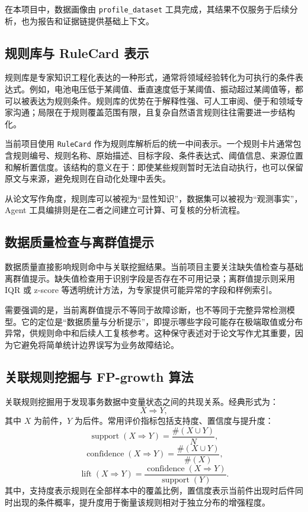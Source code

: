 \documentclass[UTF8,a4paper,zihao=-4]{ctexart}
\begin{document}
在本项目中，数据画像由 \texttt{profile\_dataset} 工具完成，其结果不仅服务于后续分析，也为报告和证据链提供基础上下文。

\subsection{规则库与 RuleCard 表示}

规则库是专家知识工程化表达的一种形式，通常将领域经验转化为可执行的条件表达式。例如，电池电压低于某阈值、垂直速度低于某阈值、振动超过某阈值等，都可以被表达为规则条件。规则库的优势在于解释性强、可人工审阅、便于和领域专家沟通；局限在于规则覆盖范围有限，且复杂自然语言规则往往需要进一步结构化。

当前项目使用 \texttt{RuleCard} 作为规则库解析后的统一中间表示。一个规则卡片通常包含规则编号、规则名称、原始描述、目标字段、条件表达式、阈值信息、来源位置和解析置信度。该结构的意义在于：即使某些规则暂时无法自动执行，也可以保留原文与来源，避免规则在自动化处理中丢失。

从论文写作角度，规则库可以被视为“显性知识”，数据集可以被视为“观测事实”，Agent 工具编排则是在二者之间建立可计算、可复核的分析流程。

\subsection{数据质量检查与离群值提示}

数据质量直接影响规则命中与关联挖掘结果。当前项目主要关注缺失值检查与基础离群值提示。缺失值检查用于识别字段是否存在不可用记录；离群值提示则采用 IQR 或 z-score 等透明统计方法，为专家提供可能异常的字段和样例索引。

需要强调的是，当前离群值提示不等同于故障诊断，也不等同于完整异常检测模型。它的定位是“数据质量与分析提示”，即提示哪些字段可能存在极端取值或分布异常，供规则命中和后续人工复核参考。这种保守表述对于论文写作尤其重要，因为它避免将简单统计边界误写为业务故障结论。

\subsection{关联规则挖掘与 FP-growth 算法}

关联规则挖掘用于发现事务数据中变量状态之间的共现关系。经典形式为：
\[
X \Rightarrow Y,
\]
其中 $X$ 为前件，$Y$ 为后件。常用评价指标包括支持度、置信度与提升度：
\[
\operatorname{support}(X \Rightarrow Y)=\frac{\#(X \cup Y)}{N},
\]
\[
\operatorname{confidence}(X \Rightarrow Y)=\frac{\#(X \cup Y)}{\#(X)},
\]
\[
\operatorname{lift}(X \Rightarrow Y)=
\frac{\operatorname{confidence}(X \Rightarrow Y)}
{\operatorname{support}(Y)}.
\]
其中，支持度表示规则在全部样本中的覆盖比例，置信度表示当前件出现时后件同时出现的条件概率，提升度用于衡量该规则相对于独立分布的增强程度。
\end{document}
